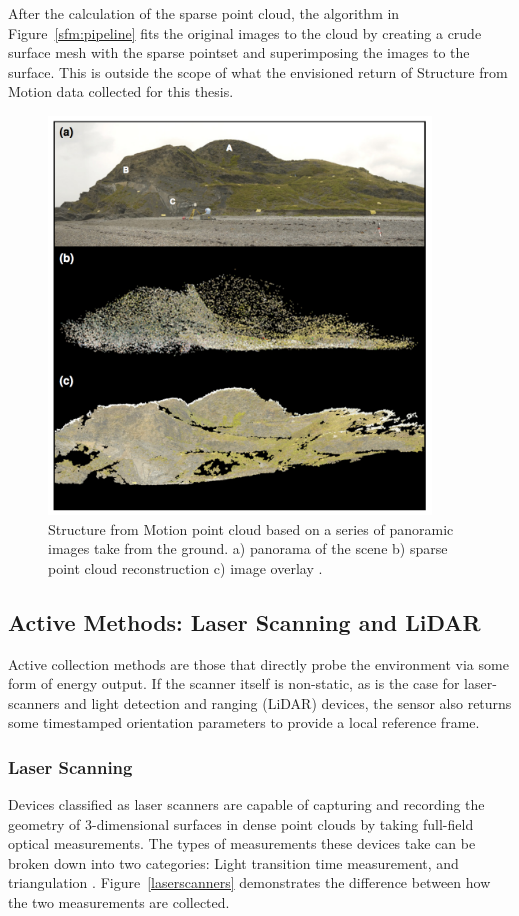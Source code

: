 \documentclass[12pt]{drexelthesis}
\let\Oldsubsection\subsection
\renewcommand{\subsection}{\FloatBarrier\Oldsubsection}
\let\Oldsubsubsection\subsubsection
\renewcommand{\subsubsection}{\FloatBarrier\Oldsubsubsection}
\begin{document}
After the calculation of the sparse point cloud, the algorithm in Figure~\ref{sfm:pipeline} fits the original images to the cloud by creating a crude surface mesh with the sparse pointset and superimposing the images to the surface. This is outside the scope of what the envisioned return of Structure from Motion data collected for this thesis.

\begin{figure}[!ht]
	\centering
	\includegraphics[width=4in]{instruments/sfmresults.png}
	\caption[Structure from Motion results]{\centering Structure from Motion point cloud based on a series of panoramic images take from the ground. a) panorama of the scene b) sparse point cloud reconstruction c) image overlay \cite{WESTOBY2012300}.}
	\label{sfm:wholedeal}
\end{figure}


\subsection{Active Methods: Laser Scanning and LiDAR}
\label{subsec:active}
Active collection methods are those that directly probe the environment via some form of energy output. If the scanner itself is non-static, as is the case for laser-scanners and light detection and ranging (LiDAR) devices, the sensor also returns some timestamped orientation parameters to provide a local reference frame.

\subsubsection{Laser Scanning}
Devices classified as laser scanners are capable of capturing and recording the geometry of 3-dimensional surfaces in dense point clouds by taking full-field optical measurements. The types of measurements these devices take can be broken down into two categories: Light transition time measurement, and triangulation \cite{basic-measurement-principles}. Figure~\ref{laserscanners} demonstrates the difference between how the two measurements are collected.
\end{document}
